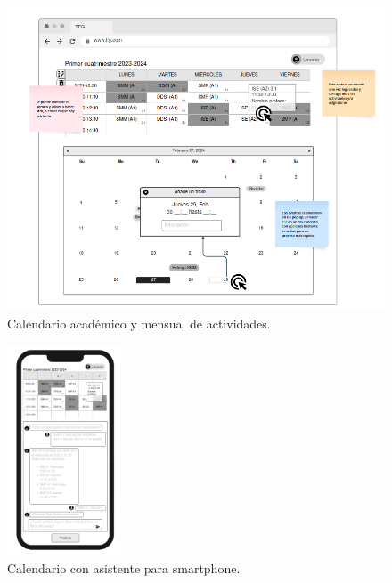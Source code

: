 \begin{figure}[H]
    \centering
    \includegraphics[width=1\textwidth]{./imagenes/Mockup_organizador.png}
    \caption{Calendario académico y mensual de actividades.}
\end{figure}

\begin{figure}[H]
    \centering
    \includegraphics[width=0.3\textwidth]{./imagenes/Mockups_smartphone.png}
    \caption{Calendario con asistente para smartphone.}
\end{figure}


